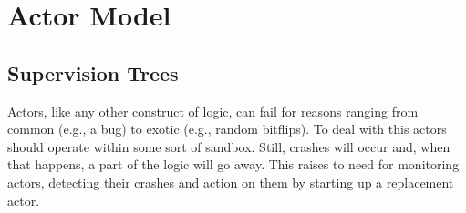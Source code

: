 \section{Actor Model}




\subsection{Supervision Trees}

Actors, like any other construct of logic, can fail for reasons ranging from common (e.g., a bug) to exotic (e.g., random bitflips). To deal with this actors should operate within some sort of sandbox. Still, crashes will occur and, when that happens, a part of the logic will go away. This raises to need for monitoring actors, detecting their crashes and action on them by starting up a replacement actor.




